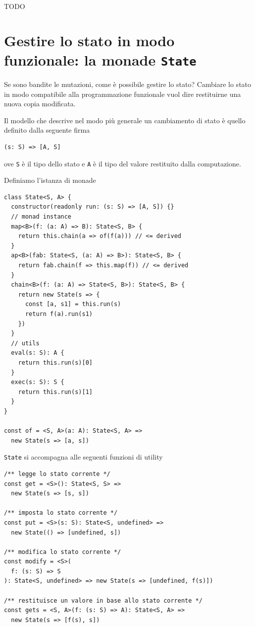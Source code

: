 \documentclass[12pt]{article}
\begin{document}
TODO

\newpage

\section{Gestire lo stato in modo funzionale: la monade \texttt{State}}

Se sono bandite le mutazioni, come è possibile gestire lo stato?
Cambiare lo stato in modo compatibile alla programmazione funzionale vuol dire restituirne una nuova copia modificata.

Il modello che descrive nel modo più generale un cambiamento di stato è quello definito dalla seguente firma

\begin{verbatim}
(s: S) => [A, S]
\end{verbatim}

ove \texttt{S} è il tipo dello stato e \texttt{A} è il tipo del valore restituito dalla computazione.

Definiamo l'istanza di monade

\begin{verbatim}
class State<S, A> {
  constructor(readonly run: (s: S) => [A, S]) {}
  // monad instance
  map<B>(f: (a: A) => B): State<S, B> {
    return this.chain(a => of(f(a))) // <= derived
  }
  ap<B>(fab: State<S, (a: A) => B>): State<S, B> {
    return fab.chain(f => this.map(f)) // <= derived
  }
  chain<B>(f: (a: A) => State<S, B>): State<S, B> {
    return new State(s => {
      const [a, s1] = this.run(s)
      return f(a).run(s1)
    })
  }
  // utils
  eval(s: S): A {
    return this.run(s)[0]
  }
  exec(s: S): S {
    return this.run(s)[1]
  }
}

const of = <S, A>(a: A): State<S, A> =>
  new State(s => [a, s])
\end{verbatim}

\texttt{State} si accompagna alle seguenti funzioni di utility

\begin{verbatim}
/** legge lo stato corrente */
const get = <S>(): State<S, S> =>
  new State(s => [s, s])

/** imposta lo stato corrente */
const put = <S>(s: S): State<S, undefined> =>
  new State(() => [undefined, s])

/** modifica lo stato corrente */
const modify = <S>(
  f: (s: S) => S
): State<S, undefined> => new State(s => [undefined, f(s)])

/** restituisce un valore in base allo stato corrente */
const gets = <S, A>(f: (s: S) => A): State<S, A> =>
  new State(s => [f(s), s])
\end{verbatim}
\end{document}
